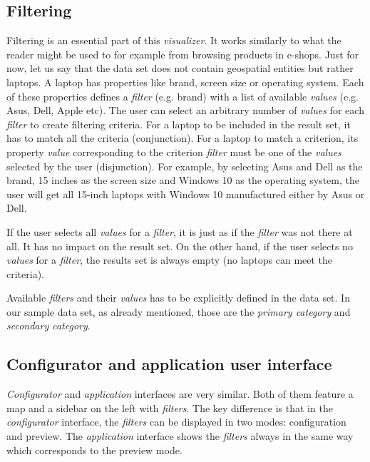 \subsection{Filtering}

Filtering is an essential part of this \emph{visualizer}. It works similarly to what the reader might be used to for example from browsing products in e-shops. Just for now, let us say that the data set does not contain geospatial entities but rather laptops. A laptop has properties like brand, screen size or operating system. Each of these properties defines a \emph{filter} (e.g. brand) with a list of available \emph{values} (e.g. Asus, Dell, Apple etc). The user can select an arbitrary number of \emph{values} for each \emph{filter} to create filtering criteria. For a laptop to be included in the result set, it has to match all the criteria (conjunction). For a laptop to match a criterion, its property \emph{value} corresponding to the criterion \emph{filter} must be one of the \emph{values} selected by the user (disjunction). For example, by selecting Asus and Dell as the brand, 15 inches as the screen size and Windows 10 as the operating system, the user will get all 15-inch laptops with Windows 10 manufactured either by Asus or Dell.

If the user selects all \emph{values} for a \emph{filter}, it is just as if the \emph{filter} was not there at all. It has no impact on the result set. On the other hand, if the user selects no \emph{values} for a \emph{filter}, the results set is always empty (no laptops can meet the criteria).

Available \emph{filters} and their \emph{values} has to be explicitly defined in the data set. In our sample data set, as already mentioned, those are the \emph{primary category} and \emph{secondary category}.

\subsection{Configurator and application user interface}

\emph{Configurator} and \emph{application} interfaces are very similar. Both of them feature a map and a sidebar on the left with \emph{filters}. The key difference is that in the \emph{configurator} interface, the \emph{filters} can be displayed in two modes: configuration and preview. The \emph{application} interface shows the \emph{filters} always in the same way which corresponds to the preview mode.

